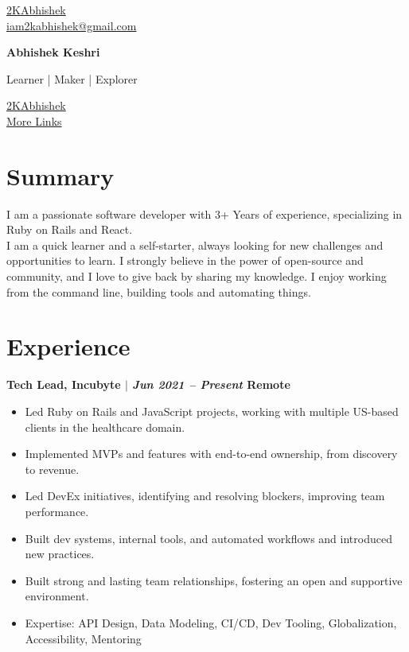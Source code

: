 \documentclass[11pt]{article} %
\newcommand{\uthree}[4]{
    {\large
        {\bfseries #1 $|$ \textit{#2} \hfill #3} \par
    }
    \begin{itemize}
        #4
    \end{itemize}
    \par\addvspace{2.5ex}%
}
\begin{document}
\begin{multicols}{3}
  \begin{flushleft}
    \color{gray}{\faGithub} \href{https://github.com/2kabhishek}{2KAbhishek} \\
    \color{gray}{\faEnvelope} \href{mailto:iam2kabhishek@gmail.com}{iam2kabhishek@gmail.com} \\
  \end{flushleft}

\columnbreak

  \begin{center}
      {\huge\bfseries Abhishek Keshri} \par
      Learner | Maker | Explorer \par
  \end{center}

\columnbreak

  \begin{flushright}
    \href{https://linkedin.com/in/2kabhishek/}{2KAbhishek} {\color{gray}{\faLinkedin}} \\
    \href{https://2kabhishek.github.io/links}{More Links} {\textcolor{gray}{\faLink}} \\
  \end{flushright}
\end{multicols}

\section{Summary}
I am a passionate software developer with 3+ Years of experience, specializing in Ruby on Rails and React. \\
I am a quick learner and a self-starter, always looking for new challenges and opportunities to learn.
I strongly believe in the power of open-source and community, and I love to give back by sharing my knowledge.
I enjoy working from the command line, building tools and automating things.

\section{Experience}
\uthree{Tech Lead, Incubyte}{Jun 2021 -- Present}{Remote}{
  \item Led Ruby on Rails and JavaScript projects, working with multiple US-based clients in the healthcare domain.
  \item Implemented  MVPs and features with end-to-end ownership, from discovery to revenue.
  \item Led DevEx initiatives, identifying and resolving blockers, improving team performance.
  \item Built dev systems, internal tools, and automated workflows and introduced new practices.
  \item Built strong and lasting team relationships, fostering an open and supportive environment.
  \item Expertise: API Design, Data Modeling, CI/CD, Dev Tooling, Globalization, Accessibility, Mentoring
}
\end{document}
